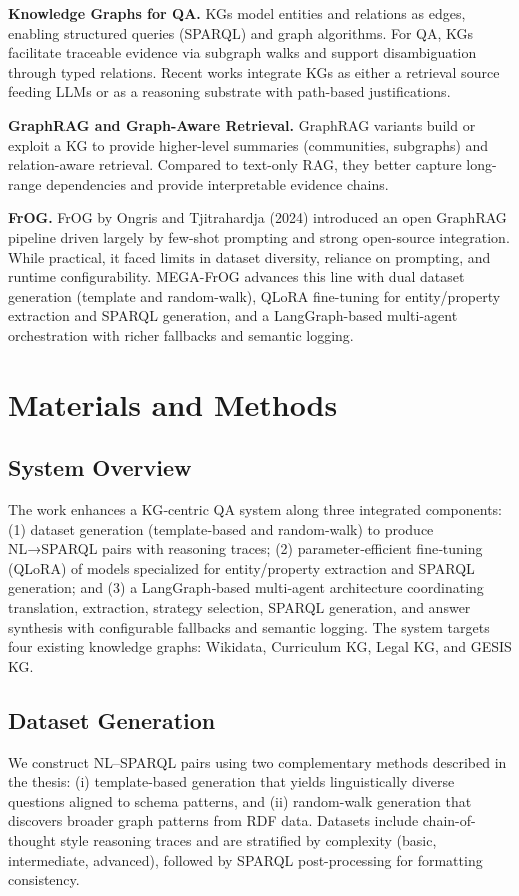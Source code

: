 \documentclass[12pt,a4paper,onecolumn]{article}
\begin{document}
\textbf{Knowledge Graphs for QA.} KGs model entities and relations as edges, enabling structured queries (SPARQL) and graph algorithms. For QA, KGs facilitate traceable evidence via subgraph walks and support disambiguation through typed relations. Recent works integrate KGs as either a retrieval source feeding LLMs or as a reasoning substrate with path-based justifications.

\textbf{GraphRAG and Graph-Aware Retrieval.} GraphRAG variants build or exploit a KG to provide higher-level summaries (communities, subgraphs) and relation-aware retrieval. Compared to text-only RAG, they better capture long-range dependencies and provide interpretable evidence chains.

\textbf{FrOG.} FrOG by Ongris and Tjitrahardja (2024) introduced an open GraphRAG pipeline driven largely by few-shot prompting and strong open-source integration. While practical, it faced limits in dataset diversity, reliance on prompting, and runtime configurability. MEGA-FrOG advances this line with dual dataset generation (template and random-walk), QLoRA fine-tuning for entity/property extraction and SPARQL generation, and a LangGraph-based multi-agent orchestration with richer fallbacks and semantic logging.

\section*{Materials and Methods}
\subsection*{System Overview}
The work enhances a KG‑centric QA system along three integrated components: (1) dataset generation (template‑based and random‑walk) to produce NL→SPARQL pairs with reasoning traces; (2) parameter‑efficient fine‑tuning (QLoRA) of models specialized for entity/property extraction and SPARQL generation; and (3) a LangGraph‑based multi‑agent architecture coordinating translation, extraction, strategy selection, SPARQL generation, and answer synthesis with configurable fallbacks and semantic logging. The system targets four existing knowledge graphs: Wikidata, Curriculum KG, Legal KG, and GESIS KG.

\subsection*{Dataset Generation}
We construct NL--SPARQL pairs using two complementary methods described in the thesis: (i) template-based generation that yields linguistically diverse questions aligned to schema patterns, and (ii) random-walk generation that discovers broader graph patterns from RDF data. Datasets include chain-of-thought style reasoning traces and are stratified by complexity (basic, intermediate, advanced), followed by SPARQL post-processing for formatting consistency.
\end{document}
